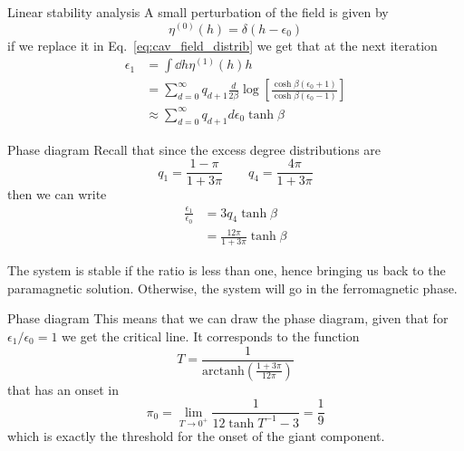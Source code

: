 \documentclass[handout]{beamer}
\newcommand{\arctanh}{\text{arctanh}}
\begin{document}
\begin{frame}{Linear stability analysis}
    A small perturbation of the field is given by
    \begin{equation}
        \eta^{(0)} (h) = \delta(h-\epsilon_0)
    \end{equation}
    if we replace it in Eq.~\ref{eq:cav_field_distrib} we get that at the next
    iteration
    \begin{align}
        \epsilon_1 &= \int \dd{h} \eta^{(1)}(h) h\\
                   &= \sum_{d=0}^{\infty} q_{d+1} \frac{d}{2\beta} \log \left[
                       \frac{\cosh{\beta(\epsilon_0+1)}}{\cosh{\beta(\epsilon_0-1)}}
                   \right]\\
                   &\approx \sum_{d=0}^{\infty} q_{d+1} d \epsilon_0
                   \tanh{\beta}
    \end{align}
\end{frame}

\begin{frame}{Phase diagram}
    Recall that since the excess degree distributions are
    $$
    q_1 = \frac{1-\pi}{1+3\pi} \qquad q_4 = \frac{4\pi}{1+3\pi}
    $$
    then we can write
    \begin{align}
        \frac{\epsilon_1}{\epsilon_0} &= 3q_4 \tanh{\beta}\\
                                      &= \frac{12\pi}{1+3\pi} \tanh{\beta}
    \end{align}

    The system is \alert{stable} if the ratio is less than one, hence bringing
    us back to the \alert{paramagnetic} solution. Otherwise, the system will go
    in the ferromagnetic phase.

\end{frame}

\begin{frame}{Phase diagram}
    This means that we can draw the phase diagram, given that for $\epsilon_1 /
    \epsilon_0 = 1$ we get the critical line. It corresponds to the function
    $$
        T = \frac{1}{\arctanh \left( \frac{1+3\pi}{12\pi} \right)}
    $$
    that has an onset in
    $$
        \pi_0 = \lim_{T\to 0^+} \frac{1}{12\tanh{T^{-1}}-3} = \frac{1}{9}
    $$
    which is exactly the threshold for the onset of the giant component.
\end{frame}
\end{document}
